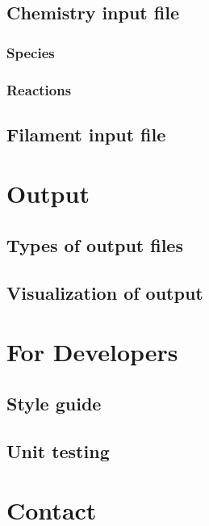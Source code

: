 \documentclass[11pt, oneside]{article}   	%
\begin{document}
\subsection{Chemistry input file}
\subsubsection{Species}
\subsubsection{Reactions}

\subsection{Filament input file}



\section {Output}
\subsection{Types of output files}
\subsection{Visualization of output}

\section{For Developers}
\subsection{Style guide}
\subsection{Unit testing}


\section{Contact}
\end{document}
